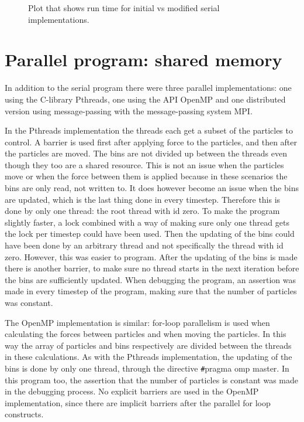 \documentclass{article}
\begin{document}
\begin{figure}[h]
    \begin{center}
        
        \caption{Plot that shows run time for initial vs modified serial implementations.} 
        \label{fig:linear}
    \end{center}
\end{figure}


\section{Parallel program: shared memory}

In addition to the serial program there were three parallel implementations: one using the C-library Pthreads, one using the API OpenMP and one distributed version using message-passing with the message-passing system MPI.

In the Pthreads implementation the threads each get a subset of the particles to control. A barrier is used first after applying force to the particles, and then after the particles are moved. The bins are not divided up between the threads even though they too are a shared resource. This is not an issue when the particles move or when the force between them is applied because in these scenarios the bins are only read, not written to. It does however become an issue when the bins are updated, which is the last thing done in every timestep. Therefore this is done by only one thread: the root thread with id zero. To make the program slightly faster, a lock combined with a way of making sure only one thread gets the lock per timestep could have been used. Then the updating of the bins could have been done by an arbitrary thread and not specifically the thread with id zero. However, this was easier to program. After the updating of the bins is made there is another barrier, to make sure no thread starts in the next iteration before the bins are sufficiently updated. When debugging the program, an assertion was made in every timestep of the program, making sure that the number of particles was constant. 

The OpenMP implementation is similar: for-loop parallelism is used when calculating the forces between particles and when moving the particles. In this way the array of particles and bins respectively are divided between the threads in these calculations. As with the Pthreads implementation, the updating of the bins is done by only one thread, through the directive \verb+#+pragma omp master. In this program too, the assertion that the number of particles is constant was made in the debugging process. No explicit barriers are used in the OpenMP implementation, since there are implicit barriers after the parallel for loop constructs. 
\end{document}
